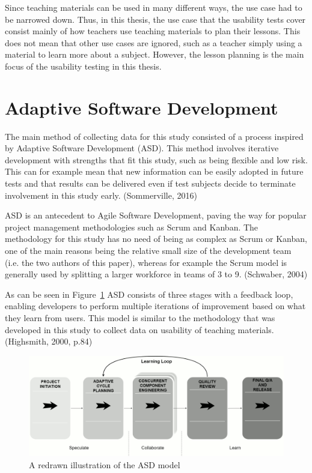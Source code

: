 Since teaching materials can be used in many different ways, the use case had to be narrowed down. Thus, in this thesis, the use case that the usability tests cover consist mainly of how teachers use teaching materials to plan their lessons. This does not mean that other use cases are ignored, such as a teacher simply using a material to learn more about a subject. However, the lesson planning is the main focus of the usability testing in this thesis.

\section{Adaptive Software Development}
The main method of collecting data for this study consisted of a process inspired by Adaptive Software Development (ASD). This method involves iterative development with strengths that fit this study, such as being flexible and low risk. This can for example mean that new information
can be easily adopted in future tests and that results can be delivered even if test subjects decide to terminate involvement in this study early. (Sommerville, 2016)

ASD is an antecedent to Agile Software Development, paving the way for popular project management methodologies such as Scrum and Kanban. The methodology for this study has no need of being as complex as Scrum or Kanban, one of the main reasons being the relative small size of the development team (i.e. the two authors of this paper), whereas for example the Scrum model is generally used by splitting a larger workforce in teams of 3 to 9. (Schwaber, 2004)

As can be seen in Figure~\ref{asd} ASD consists of three stages with a feedback loop, enabling developers to perform multiple iterations of improvement based on what they learn from users. This model is similar to the methodology that was developed in this study to collect data on usability of teaching materials. (Highsmith, 2000, p.84)


\begin{figure}[H]
\hspace*{-1cm}
\centering
\includegraphics[scale=0.25]{figure/asd.png}
\caption{A redrawn illustration of the ASD model} %
\label{asd}
\end{figure}


